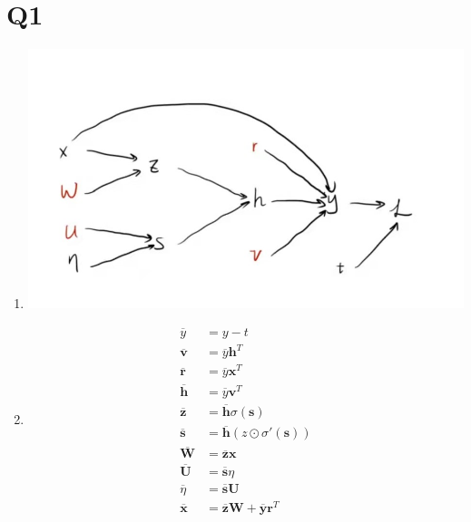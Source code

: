 \documentclass[12pt]{article}
\begin{document}
	\section*{Q1}
	\begin{enumerate}[label=\alph*)]
		\item \includegraphics[scale=0.4]{1a}
		\item \begin{align*}
			\overline{y}&=y-t\\
			\overline{\textbf{v}}&=\overline{y}\textbf{h}^T\\
			\overline{\textbf{r}}&=\overline{y}\textbf{x}^T\\
			\overline{\textbf{h}}&=\overline{y}\textbf{v}^T\\
			\overline{\textbf{z}}&=\overline{\textbf{h}}\sigma(\textbf{s})\\
			\overline{\textbf{s}}&=\overline{\textbf{h}}(z\odot\sigma'(\textbf{s}))\\
			\overline{\textbf{W}}&=\overline{\textbf{z}}\textbf{x}\\
			\overline{\textbf{U}}&=\overline{\textbf{s}}\eta\\
			\overline{\eta}&=\overline{\textbf{s}}\textbf{U}\\
			\overline{\textbf{x}}&=\overline{\textbf{z}}\textbf{W}+\overline{\textbf{y}}\textbf{r}^T
		\end{align*}
	\end{enumerate}
	\newpage
	
\end{document}

